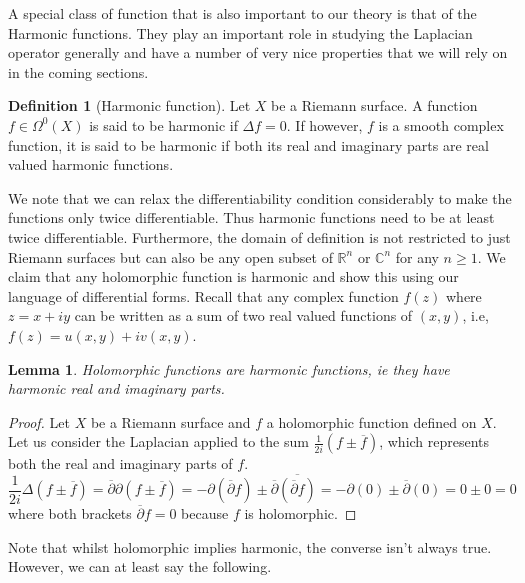 \documentclass[11pt]{report}
\newtheorem{lemma}[thm]{Lemma}
\theoremstyle{definition}
\newtheorem{defn}[thm]{Definition}
\begin{document}
A special class of function that is also important to our theory is that of the 
Harmonic functions. They play an important role in studying the Laplacian operator generally and have a number of very nice properties that we will rely on in the coming sections.
\begin{defn}[Harmonic function]\label{HarmonicDef}
  Let $X$ be a Riemann surface. A function $f\in \Omega^0(X)$ is said to be harmonic if $\Delta f = 0$. If however, $f$ is a smooth complex function, it is said to be harmonic if both its real and imaginary parts are real valued harmonic functions.
\end{defn}
We note that we can relax the differentiability condition considerably to make the functions only twice differentiable. Thus harmonic functions need to be at least twice differentiable. Furthermore, the domain of definition is not restricted to just Riemann surfaces but can also be any open subset of $\mathbb{R}^n$ or $\mathbb{C}^n$ for any $n\geq 1$. We claim that any holomorphic function is harmonic and show this using our language of differential forms. Recall that any complex function $f(z)$ where $z=x+iy$ can be written as a sum of two real valued functions of $(x,y)$, i.e, $f(z)=u(x,y)+iv(x,y)$.
\begin{lemma}\label{HolIsHarm}
  Holomorphic functions are harmonic functions, ie they have harmonic real and imaginary parts. 
\end{lemma} 
\begin{proof}
  Let $X$ be a Riemann surface and $f$ a holomorphic function defined on $X$.
  Let us consider the Laplacian applied to the sum $\frac{1}{2i}(f \pm \overline{f})$, which represents both the real and imaginary parts of $f$.
  \[\frac{1}{2i}\Delta(f \pm \overline{f}) = \overline{\partial}\partial(f \pm \overline{f})=-\partial(\overline{\partial}f) \pm \overline{\partial}\overline{(\overline{\partial}f)}=-\partial(0) \pm \overline{\partial}(0) = 0 \pm 0 = 0\]
  where both brackets $\overline{\partial} f = 0$ because $f$ is holomorphic.
\end{proof}

Note that whilst holomorphic implies harmonic, the converse isn't always true. However, we can at least say the following.
\end{document}
